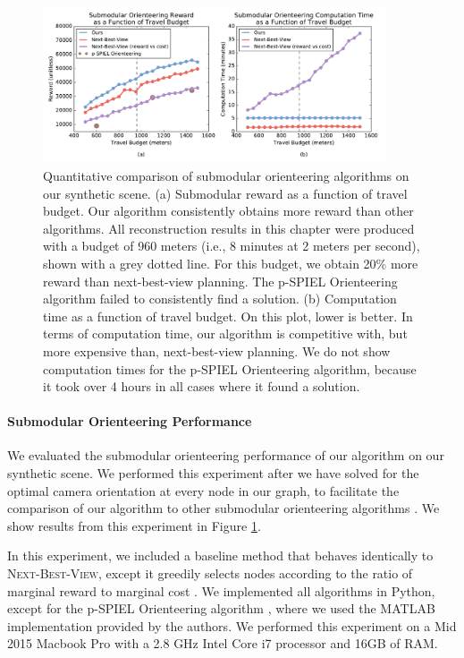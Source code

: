\begin{figure}[t]
\begin{center}
\includegraphics[width=4.0in]{images/2017_iccv/00_quantitative.pdf}
\end{center}
\caption{
Quantitative comparison of submodular orienteering algorithms on our synthetic scene.
(a) Submodular reward as a function of travel budget.
Our algorithm consistently obtains more reward than other algorithms.
All reconstruction results in this chapter were produced with a budget of 960 meters (i.e., 8 minutes at 2 meters per second), shown with a grey dotted line.
For this budget, we obtain 20\% more reward than next-best-view planning. The p-SPIEL Orienteering algorithm \cite{singh:2009b} failed to consistently find a solution.
(b) Computation time as a function of travel budget.
On this plot, lower is better.
In terms of computation time, our algorithm is competitive with, but more expensive than, next-best-view planning.
We do not show computation times for the p-SPIEL Orienteering algorithm, because it took over 4 hours in all cases where it found a solution.
}
\label{fig:ch4:results_orienteering}
\end{figure}

\paragraph{Submodular Orienteering Performance}
We evaluated the submodular orienteering performance of our algorithm on our synthetic scene.
We performed this experiment after we have solved for the optimal camera orientation at every node in our graph, to facilitate the comparison of our algorithm to other submodular orienteering algorithms \cite{singh:2009b,zhang:2016}.
We show results from this experiment in Figure \ref{fig:ch4:results_orienteering}.

In this experiment, we included a baseline method that behaves identically to \textsc{Next-Best-View}, except it greedily selects nodes according to the ratio of marginal reward to marginal cost \cite{zhang:2016}.
We implemented all algorithms in Python, except for the p-SPIEL Orienteering algorithm \cite{singh:2009b}, where we used the MATLAB implementation provided by the authors.
We performed this experiment on a Mid 2015 Macbook Pro with a 2.8 GHz Intel Core i7 processor and 16GB of RAM.

